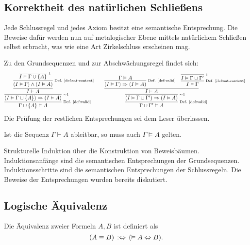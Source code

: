 \subsection{Korrektheit des natürlichen Schließens}

Jede Schlussregel und jedes Axiom besitzt eine semantische Entsprechung.
Die Beweise dafür werden nun auf metalogischer Ebene mittels natürlichem
Schließen selbst erbracht, was wie eine Art Zirkelschluss erscheinen
mag.

Zu den Grundsequenzen und zur Abschwächungsregel findet sich:
\[
\begin{array}{@{}l@{\qquad}l}
\infer[\infernote{Def. \ref{def:valid}}]{\Gamma\cup\{A\}\models A}{
  \infer[\infernote{$\sim$1}]{(I\models \Gamma\cup\{A\})\cond (I\models A)}{
    \infer{I\models A}{
      \infer[\infernote{Def. \ref{def:sat-context}}]{(I\models\Gamma)\land (I\models A)}{
        \infer[\infernote{1}]{I\models\Gamma\cup\{A\}}{}}}}}
&
\infer[\infernote{Def. \ref{def:valid}}]{\Gamma\cup\Gamma'\models A}{
  \infer[\infernote{$\sim$1}]{(I\models\Gamma\cup\Gamma')\cond (I\models A)}{
    \infer{I\models A}{
      \infer[\infernote{Def. \ref{def:valid}}]{(I\models\Gamma)\cond (I\models A)}{
        \Gamma\models A}
    & \infer[\infernote{Def. \ref{def:sat-context}}]{I\models\Gamma}{
        \infer[\infernote{1}]{I\models\Gamma\cup\Gamma'}{}}}}}
\end{array}
\]
Die Prüfung der restlichen Entsprechungen sei dem Leser überlassen.

\begin{Satz}\newlinefirst
Ist die Sequenz $\Gamma\vdash A$ ableitbar, so muss auch
$\Gamma\models A$ gelten.
\end{Satz}
\begin{Beweis}
Strukturelle Induktion über die Konstruktion von Beweisbäumen.
Induktionsanfänge sind die semantischen Entsprechungen
der Grundsequenzen. Induktionsschritte sind die semantischen
Entsprechungen der Schlussregeln. Die Beweise der Entsprechungen
wurden bereits diskutiert.\,\qedsymbol
\end{Beweis}


\newpage
\subsection{Logische Äquivalenz}
\begin{Definition}\newlinefirst
Die Äquivalenz zweier Formeln $A,B$ ist definiert als
\[(A\equiv B)\,:\Leftrightarrow\, (\vDash A\Leftrightarrow B).\]
\end{Definition}

